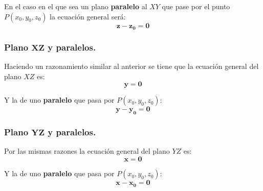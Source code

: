 \documentclass[a4paper,11pt,answers]{exam}
\begin{document}
En el caso en el que sea un plano \textbf{paralelo} al $XY$ que pase por el punto $P(x_0, y_0, z_0)$ la ecuación general será:
\[\boldsymbol{z-z_0 = 0}\]
\subsubsection{Plano $\boldsymbol{XZ}$ y paralelos.}
Haciendo un razonamiento similar al anterior se tiene que la ecuación general del plano $XZ$ es:
\[\boldsymbol{y = 0}\]

Y la de uno \textbf{paralelo} que pasa por $P(x_0, y_0, z_0)$:
\[\boldsymbol{y - y_0 = 0}\]

\subsubsection{Plano $\boldsymbol{YZ}$ y paralelos.}
Por las mismas razones la ecuación general del plano $YZ$ es:
\[\boldsymbol{x = 0}\]

Y la de uno \textbf{paralelo} que pasa por $P(x_0, y_0, z_0)$:
\[\boldsymbol{x - x_0 = 0}\]
\end{document}
